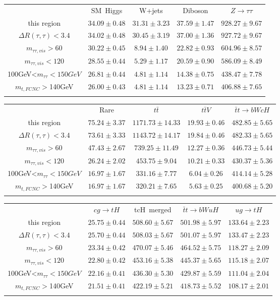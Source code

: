 \centering
\begin{tabular}{ccccc} \toprule\toprule
 & SM~Higgs & W+jets & Diboson & $Z\to \tau\tau$\\
 this region & $34.09\pm0.48$ & $31.31\pm3.23$ & $37.59\pm1.47$ & $928.27\pm9.67$\\
$\Delta R(\tau,\tau)<3.4$ & $34.02\pm0.48$ & $30.45\pm3.19$ & $37.00\pm1.36$ & $927.72\pm9.67$\\
$m_{\tau\tau,vis}>60$ & $30.22\pm0.45$ & $8.94\pm1.40$ & $22.82\pm0.93$ & $604.96\pm8.57$\\
$m_{\tau\tau,vis}<120$ & $28.55\pm0.44$ & $5.29\pm1.17$ & $20.59\pm0.90$ & $586.09\pm8.49$\\
100GeV<$m_{\tau\tau}<150GeV$ & $26.81\pm0.44$ & $4.81\pm1.14$ & $14.38\pm0.75$ & $438.47\pm7.78$\\
$m_{t,FCNC}>$140GeV & $26.00\pm0.43$ & $4.81\pm1.14$ & $13.23\pm0.71$ & $406.88\pm7.65$\\
\bottomrule\bottomrule\\
\end{tabular}
\begin{tabular}{ccccc} \toprule\toprule
 & Rare & $t\bar{t}$ & $t\bar{t}V$ & $\bar{t}t\to bWcH$\\
 this region & $75.24\pm3.37$ & $1171.73\pm14.33$ & $19.93\pm0.46$ & $482.85\pm5.65$\\
$\Delta R(\tau,\tau)<3.4$ & $73.61\pm3.33$ & $1143.72\pm14.17$ & $19.84\pm0.46$ & $482.33\pm5.65$\\
$m_{\tau\tau,vis}>60$ & $47.43\pm2.67$ & $739.25\pm11.49$ & $12.27\pm0.36$ & $446.73\pm5.44$\\
$m_{\tau\tau,vis}<120$ & $26.24\pm2.02$ & $453.75\pm9.04$ & $10.21\pm0.33$ & $430.37\pm5.36$\\
100GeV<$m_{\tau\tau}<150GeV$ & $16.97\pm1.67$ & $331.16\pm7.77$ & $6.04\pm0.26$ & $414.14\pm5.28$\\
$m_{t,FCNC}>$140GeV & $16.97\pm1.67$ & $320.21\pm7.65$ & $5.63\pm0.25$ & $400.68\pm5.20$\\
\bottomrule\bottomrule\\
\end{tabular}
\begin{tabular}{ccccc} \toprule\toprule
 & $cg\to tH$ & tcH~merged & $\bar{t}t\to bWuH$ & $ug\to tH$\\
 this region & $25.75\pm0.44$ & $508.60\pm5.67$ & $501.98\pm5.97$ & $133.64\pm2.23$\\
$\Delta R(\tau,\tau)<3.4$ & $25.70\pm0.44$ & $508.03\pm5.67$ & $501.07\pm5.97$ & $133.47\pm2.23$\\
$m_{\tau\tau,vis}>60$ & $23.34\pm0.42$ & $470.07\pm5.46$ & $464.52\pm5.75$ & $118.27\pm2.09$\\
$m_{\tau\tau,vis}<120$ & $22.80\pm0.42$ & $453.16\pm5.38$ & $445.37\pm5.65$ & $115.18\pm2.07$\\
100GeV<$m_{\tau\tau}<150GeV$ & $22.16\pm0.41$ & $436.30\pm5.30$ & $429.87\pm5.59$ & $111.04\pm2.04$\\
$m_{t,FCNC}>$140GeV & $21.51\pm0.41$ & $422.19\pm5.21$ & $418.73\pm5.52$ & $108.17\pm2.01$\\
\bottomrule\bottomrule\\
\end{tabular}
